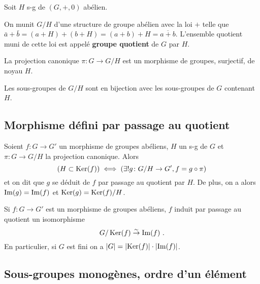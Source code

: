 	Soit $H$ s-g de $(G,+,0)$ abélien.

	\begin{lem}
		On munit $G/H$ d'une structure de groupe abélien avec la loi $+$ telle que $\bar{a} + \bar{b} = (a + H) + (b + H) = (a + b) + H = \overline{a + b}$.
		L'ensemble quotient muni de cette loi est appelé \textbf{groupe quotient} de $G$ par $H$.
	\end{lem}


	\begin{pop}
		La projection canonique $\pi \colon G \to G/H$ est un morphisme de groupes, surjectif, de noyau $H$.
	\end{pop}

	\begin{thm}
		Les sous-groupes de $G/H$ sont en bijection avec les sous-groupes de $G$ contenant $H$.
	\end{thm}


\subsection{Morphisme défini par passage au quotient}

	\begin{thm}[de factorisation]
		Soient $f \colon G \to G'$ un morphisme de groupes abéliens, $H$ un s-g de $G$ et $\pi \colon G \to G/H$ la projection canonique.
		Alors
		$$\left( H \subset \operatorname{Ker}(f) \right) \iff \left( \exists ! g \colon G/H \to G', f = g \circ \pi \right)$$
		et on dit que $g$ se déduit de $f$ par passage au quotient par $H$.
		De plus, on a alors $\operatorname{Im}(g) = \operatorname{Im}(f)$ et $\operatorname{Ker}(g) = \operatorname{Ker}(f)/H$.
	\end{thm}

	\begin{cor}
		Si $f \colon G \to G'$ est un morphisme de groupes abéliens, $f$ induit par passage au quotient un isomorphisme
		$$G/\operatorname{Ker}(f) \overset{\sim}{\to} \operatorname{Im}(f)\ .$$
		En particulier, si $G$ est fini on a $\left\lvert G\right\rvert = \left\lvert\operatorname{Ker}(f)\right\rvert \cdot \left\lvert\operatorname{Im}(f)\right\rvert$.
	\end{cor}


\subsection{Sous-groupes monogènes, ordre d'un élément}

